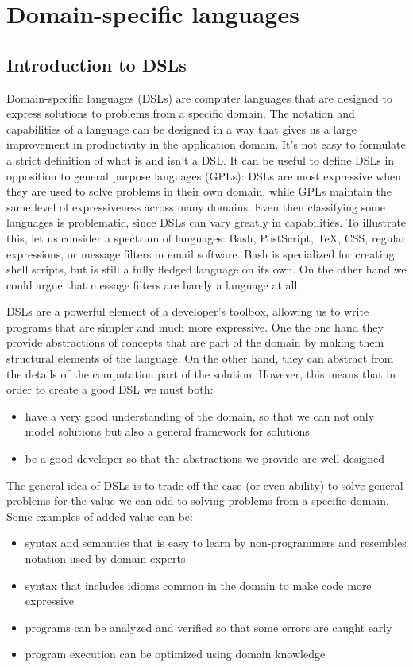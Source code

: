 \chapter{Domain-specific languages}

\section{Introduction to DSLs}

Domain-specific languages (DSLs) are computer languages that are designed to express solutions to problems from a specific domain.
The notation and capabilities of a language can be designed in a way that gives us a large improvement in productivity in the application domain.
It's not easy to formulate a strict definition of what is and isn't a DSL.
It can be useful to define DSLs in opposition to general purpose languages (GPLs): DSLs are most expressive when they are used to solve problems in their own domain, while GPLs maintain the same level of expressiveness across many domains.
Even then classifying some languages is problematic, since DSLs can vary greatly in capabilities.
To illustrate this, let us consider a spectrum of languages: Bash, PostScript, TeX, CSS, regular expressions, or message filters in email software.
Bash is specialized for creating shell scripts, but is still a fully fledged language on its own.
On the other hand we could argue that message filters are barely a language at all.

DSLs are a powerful element of a developer's toolbox, allowing us to write programs that are simpler and much more expressive.
One the one hand they provide abstractions of concepts that are part of the domain by making them structural elements of the language.
On the other hand, they can abstract from the details of the computation part of the solution.
However, this means that in order to create a good DSL we must both: 
\begin{itemize}
	\item have a very good understanding of the domain, so that we can not only model solutions but also a general framework for solutions
	\item be a good developer so that the abstractions we provide are well designed
\end{itemize} 

The general idea of DSLs is to trade off the ease (or even ability) to solve general problems for the value we can add to solving problems from a specific domain.
Some examples of added value can be:
\begin{itemize}
	\item syntax and semantics that is easy to learn by non-programmers and resembles notation used by domain experts
	\item syntax that includes idioms common in the domain to make code more expressive
	\item programs can be analyzed and verified so that some errors are caught early
	\item program execution can be optimized using domain knowledge
\end{itemize}


